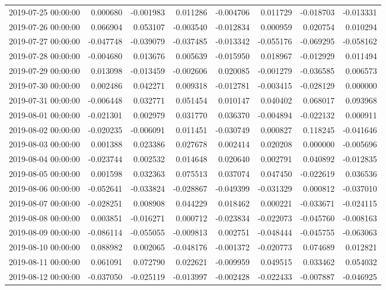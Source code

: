 \begin{tabular}{lrrrrrrr}
2019-07-25 00:00:00 & 0.000680 & -0.001983 & 0.011286 & -0.004706 & 0.011729 & -0.018703 & -0.013331 \\
2019-07-26 00:00:00 & 0.066904 & 0.053107 & -0.003540 & -0.012834 & 0.000959 & 0.020754 & 0.010294 \\
2019-07-27 00:00:00 & -0.047748 & -0.039079 & -0.037485 & -0.013342 & -0.055176 & -0.069295 & -0.058162 \\
2019-07-28 00:00:00 & -0.004680 & 0.013676 & 0.005639 & -0.015950 & 0.018967 & -0.012929 & 0.011494 \\
2019-07-29 00:00:00 & 0.013098 & -0.013459 & -0.002606 & 0.020085 & -0.001279 & -0.036585 & 0.006573 \\
2019-07-30 00:00:00 & 0.002486 & 0.042271 & 0.009318 & -0.012781 & -0.003415 & -0.028129 & 0.000000 \\
2019-07-31 00:00:00 & -0.006448 & 0.032771 & 0.051454 & 0.010147 & 0.040402 & 0.068017 & 0.093968 \\
2019-08-01 00:00:00 & -0.021301 & 0.002979 & 0.031770 & 0.036370 & -0.004894 & -0.022132 & 0.000911 \\
2019-08-02 00:00:00 & -0.020235 & -0.006091 & 0.011451 & -0.030749 & 0.000827 & 0.118245 & -0.041646 \\
2019-08-03 00:00:00 & 0.001388 & 0.023386 & 0.027678 & 0.002414 & 0.020208 & 0.000000 & -0.005696 \\
2019-08-04 00:00:00 & -0.023744 & 0.002532 & 0.014648 & 0.020640 & 0.002791 & 0.040892 & -0.012835 \\
2019-08-05 00:00:00 & 0.001598 & 0.032363 & 0.075513 & 0.037074 & 0.047450 & -0.022619 & 0.036536 \\
2019-08-06 00:00:00 & -0.052641 & -0.033824 & -0.028867 & -0.049399 & -0.031329 & 0.000812 & -0.037010 \\
2019-08-07 00:00:00 & -0.028251 & 0.008908 & 0.044229 & 0.018462 & 0.000221 & -0.033671 & -0.024115 \\
2019-08-08 00:00:00 & 0.003851 & -0.016271 & 0.000712 & -0.023834 & -0.022073 & -0.045760 & -0.008163 \\
2019-08-09 00:00:00 & -0.086114 & -0.055055 & -0.009813 & 0.002751 & -0.048444 & -0.045755 & -0.063063 \\
2019-08-10 00:00:00 & 0.088982 & 0.002065 & -0.048176 & -0.001372 & -0.020773 & 0.074689 & 0.012821 \\
2019-08-11 00:00:00 & 0.061091 & 0.072790 & 0.022621 & -0.009959 & 0.049515 & 0.033462 & 0.054032 \\
2019-08-12 00:00:00 & -0.037050 & -0.025119 & -0.013997 & -0.002428 & -0.022433 & -0.007887 & -0.046925 \\

\end{tabular}
